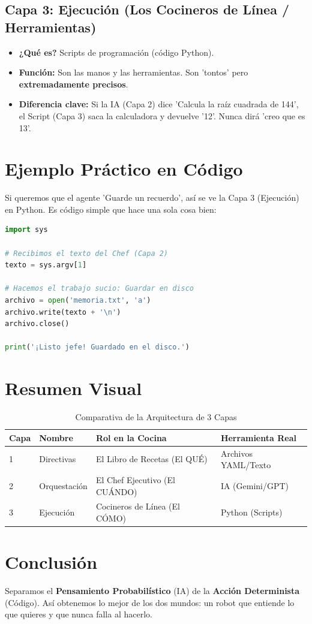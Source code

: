 \documentclass[12pt, a4paper]{article}
\begin{document}
\subsection{Capa 3: Ejecución (Los Cocineros de Línea / Herramientas)}
\begin{itemize}
    \item \textbf{¿Qué es?} Scripts de programación (código Python).
    \item \textbf{Función:} Son las manos y las herramientas. Son 'tontos' pero \textbf{extremadamente precisos}.
    \item \textbf{Diferencia clave:} Si la IA (Capa 2) dice 'Calcula la raíz cuadrada de 144', el Script (Capa 3) saca la calculadora y devuelve '12'. Nunca dirá 'creo que es 13'.
\end{itemize}

\section{Ejemplo Práctico en Código}

Si queremos que el agente 'Guarde un recuerdo', así se ve la Capa 3 (Ejecución) en Python. Es código simple que hace una sola cosa bien:

\begin{lstlisting}[language=Python, caption=Script de Ejecución (Capa 3)]
import sys

# Recibimos el texto del Chef (Capa 2)
texto = sys.argv[1]

# Hacemos el trabajo sucio: Guardar en disco
archivo = open('memoria.txt', 'a')
archivo.write(texto + '\n')
archivo.close()

print('¡Listo jefe! Guardado en el disco.')
\end{lstlisting}

\section{Resumen Visual}

\begin{table}[h]
\centering
\begin{tabular}{@{}llll@{}}
\toprule
\textbf{Capa} & \textbf{Nombre} & \textbf{Rol en la Cocina} & \textbf{Herramienta Real} \\ \midrule
1 & Directivas & El Libro de Recetas (El QUÉ) & Archivos YAML/Texto \\
2 & Orquestación & El Chef Ejecutivo (El CUÁNDO) & IA (Gemini/GPT) \\
3 & Ejecución & Cocineros de Línea (El CÓMO) & Python (Scripts) \\ \bottomrule
\end{tabular}
\caption{Comparativa de la Arquitectura de 3 Capas}
\end{table}

\section{Conclusión}
Separamos el \textbf{Pensamiento Probabilístico} (IA) de la \textbf{Acción Determinista} (Código). Así obtenemos lo mejor de los dos mundos: un robot que entiende lo que quieres y que nunca falla al hacerlo.
\end{document}
